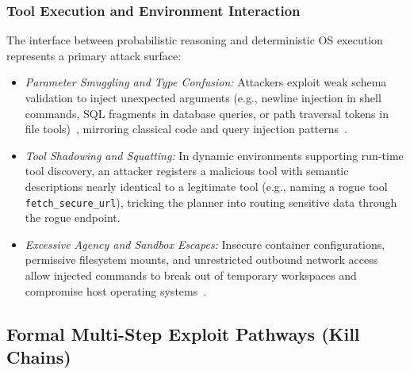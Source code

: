 \subsubsection{Tool Execution and Environment Interaction}
The interface between probabilistic reasoning and deterministic OS execution represents a primary attack surface:
\begin{itemize}
    \item \textit{Parameter Smuggling and Type Confusion:} Attackers exploit weak schema validation to inject unexpected arguments (e.g., newline injection in shell commands, SQL fragments in database queries, or path traversal tokens in file tools)~\cite{liu2024demystifying}, mirroring classical code and query injection patterns~\cite{m2022semantic, oesch2026living}.
    \item \textit{Tool Shadowing and Squatting:} In dynamic environments supporting run-time tool discovery, an attacker registers a malicious tool with semantic descriptions nearly identical to a legitimate tool (e.g., naming a rogue tool \texttt{fetch\_secure\_url}), tricking the planner into routing sensitive data through the rogue endpoint.
    \item \textit{Excessive Agency and Sandbox Escapes:} Insecure container configurations, permissive filesystem mounts, and unrestricted outbound network access allow injected commands to break out of temporary workspaces and compromise host operating systems~\cite{liu2024demystifying}.
\end{itemize}

\subsection{Formal Multi-Step Exploit Pathways (Kill Chains)}
\label{subsec:kill_chains}

